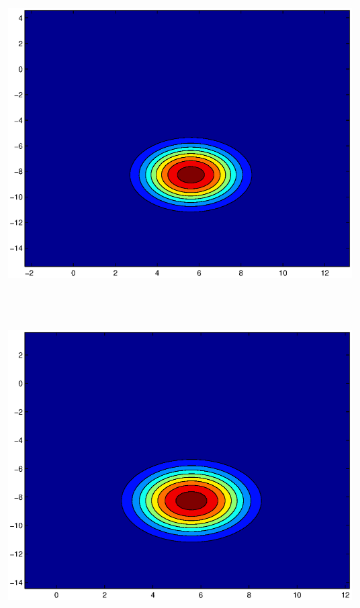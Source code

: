 \documentclass[useAMS,usenatbib,fleqn]{mn2e}
\begin{document}
\begin{figure}
        \centering
        \begin{subfigure}[b]{0.3\columnwidth}
               \includegraphics[width=\textwidth]{figures/GL1.eps}
        \end{subfigure}
        ~
         \begin{subfigure}[b]{0.3\columnwidth}
                \includegraphics[width=\textwidth]{figures/VL1.eps}
        \end{subfigure}
        ~
        \begin{subfigure}[b]{0.3\columnwidth}

\end{subfigure}
\end{figure}
\end{document}

